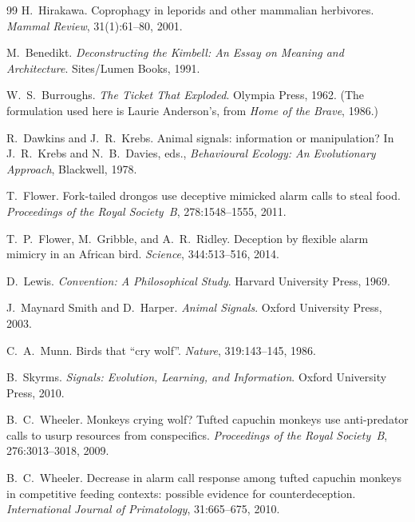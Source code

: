 \begin{thebibliography}{99}
H.~Hirakawa. \newblock Coprophagy in leporids and other mammalian herbivores. \newblock \emph{Mammal Review}, 31(1):61--80, 2001.

M.~Benedikt. \newblock \emph{Deconstructing the Kimbell: An Essay on Meaning and Architecture}. \newblock Sites/Lumen Books, 1991.

W.~S.~Burroughs. \newblock \emph{The Ticket That Exploded}. \newblock Olympia Press, 1962. \newblock (The formulation used here is Laurie Anderson's, from \emph{Home of the Brave}, 1986.)

R.~Dawkins and J.~R.~Krebs. \newblock Animal signals: information or manipulation? \newblock In J.~R.~Krebs and N.~B.~Davies, eds., \emph{Behavioural Ecology: An Evolutionary Approach}, Blackwell, 1978.

T.~Flower. \newblock Fork-tailed drongos use deceptive mimicked alarm calls to steal food. \newblock \emph{Proceedings of the Royal Society~B}, 278:1548--1555, 2011.

T.~P.~Flower, M.~Gribble, and A.~R.~Ridley. \newblock Deception by flexible alarm mimicry in an African bird. \newblock \emph{Science}, 344:513--516, 2014.

D.~Lewis. \newblock \emph{Convention: A Philosophical Study}. \newblock Harvard University Press, 1969.

J.~Maynard Smith and D.~Harper. \newblock \emph{Animal Signals}. \newblock Oxford University Press, 2003.

C.~A.~Munn. \newblock Birds that ``cry wolf''. \newblock \emph{Nature}, 319:143--145, 1986.

B.~Skyrms. \newblock \emph{Signals: Evolution, Learning, and Information}. \newblock Oxford University Press, 2010.

B.~C.~Wheeler. \newblock Monkeys crying wolf? Tufted capuchin monkeys use anti-predator calls to usurp resources from conspecifics. \newblock \emph{Proceedings of the Royal Society~B}, 276:3013--3018, 2009.

B.~C.~Wheeler. \newblock Decrease in alarm call response among tufted capuchin monkeys in competitive feeding contexts: possible evidence for counterdeception. \newblock \emph{International Journal of Primatology}, 31:665--675, 2010.


\end{thebibliography}

